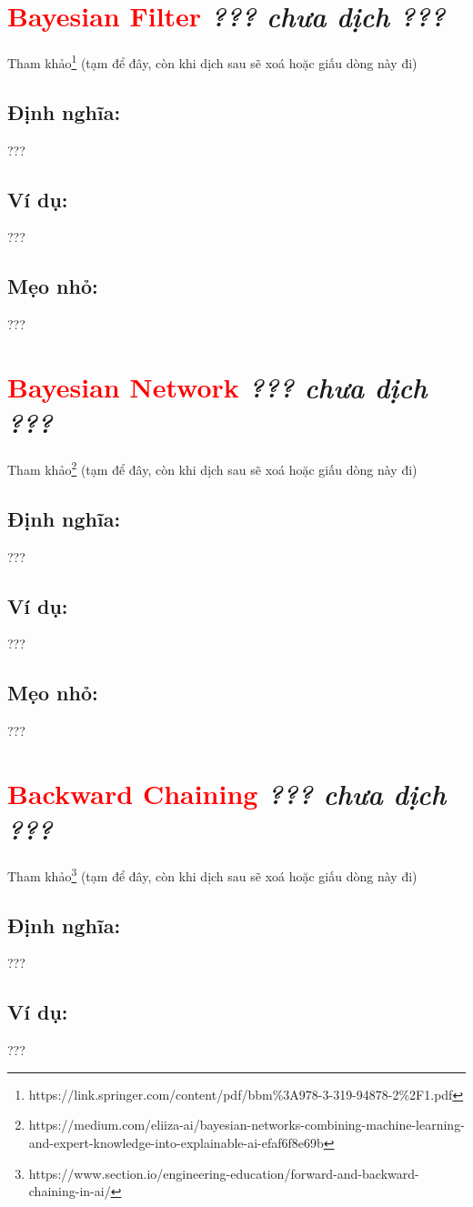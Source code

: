\section*{\huge \textcolor{Red}{Bayesian Filter}  \small \textit{??? chưa dịch ???} }
Tham khảo\footnote{https://link.springer.com/content/pdf/bbm\%3A978-3-319-94878-2\%2F1.pdf} (tạm để đây, còn khi dịch sau sẽ xoá hoặc giấu dòng này đi)
\subsection*{Định nghĩa:}
???
\subsection*{Ví dụ:}
???
\subsection*{Mẹo nhỏ:}
???
\section*{\huge \textcolor{Red}{Bayesian Network}  \small \textit{??? chưa dịch ???} }
Tham khảo\footnote{https://medium.com/eliiza-ai/bayesian-networks-combining-machine-learning-and-expert-knowledge-into-explainable-ai-efaf6f8e69b} (tạm để đây, còn khi dịch sau sẽ xoá hoặc giấu dòng này đi)
\subsection*{Định nghĩa:}
???
\subsection*{Ví dụ:}
???
\subsection*{Mẹo nhỏ:}
???
\section*{\huge \textcolor{Red}{Backward Chaining}  \small \textit{??? chưa dịch ???} }
Tham khảo\footnote{https://www.section.io/engineering-education/forward-and-backward-chaining-in-ai/} (tạm để đây, còn khi dịch sau sẽ xoá hoặc giấu dòng này đi)
\subsection*{Định nghĩa:}
???
\subsection*{Ví dụ:}
???
